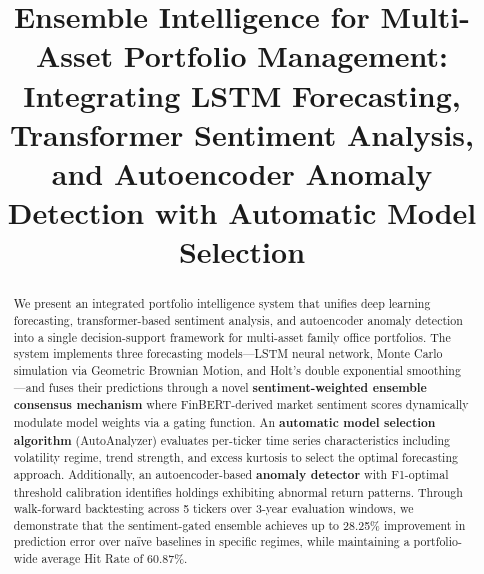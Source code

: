 \documentclass[conference]{IEEEtran}
\begin{document}
\title{Ensemble Intelligence for Multi-Asset Portfolio Management: \\
Integrating LSTM Forecasting, Transformer Sentiment Analysis, \\
and Autoencoder Anomaly Detection with Automatic Model Selection}

\author{
}

\maketitle

\begin{abstract}
We present an integrated portfolio intelligence system that unifies
deep learning forecasting, transformer-based sentiment analysis, and
autoencoder anomaly detection into a single decision-support framework
for multi-asset family office portfolios. The system implements three
forecasting models---LSTM neural network, Monte Carlo simulation via
Geometric Brownian Motion, and Holt's double exponential smoothing---and
fuses their predictions through a novel \textbf{sentiment-weighted ensemble
consensus mechanism} where FinBERT-derived market sentiment scores
dynamically modulate model weights via a gating function. An
\textbf{automatic model selection algorithm} (AutoAnalyzer) evaluates
per-ticker time series characteristics including volatility regime,
trend strength, and excess kurtosis to select the optimal forecasting
approach. Additionally, an autoencoder-based \textbf{anomaly detector}
with F1-optimal threshold calibration identifies holdings exhibiting
abnormal return patterns. Through walk-forward backtesting across
5 tickers over 3-year evaluation windows, we demonstrate that
the sentiment-gated ensemble achieves up to 28.25\% improvement in 
prediction error over na\"ive baselines in specific regimes, 
while maintaining a portfolio-wide average Hit Rate of 60.87\%.
\end{abstract}
\end{document}

